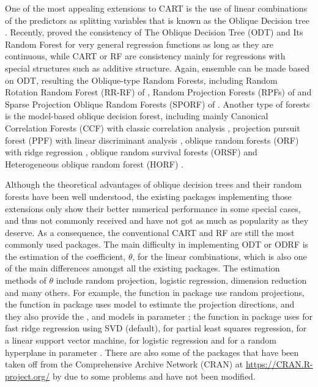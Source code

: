 \documentclass[nojss]{jss}
\newcommand{\fct}[1]{\code{#1()}}
\numberwithin{equation}{section}
\begin{document}
One of the most appealing extensions to CART is the use of linear combinations of the predictors as splitting variables that is known as the Oblique Decision tree \cite{Heath93inductionof}. Recently, \cite{zhan2022consistency} proved the consistency of The Oblique Decision Tree (\textsf{ODT}) and Its Random Forest for very general regression functions as long as they are continuous, while CART or RF are consistency mainly for regressions with special structures such as additive structure.  Again, ensemble can be made based on ODT, resulting the Oblique-type Random Forests, including Random Rotation Random Forest (\textsf{RR-RF}) of \cite{blaser2016random}, Random Projection Forests (\textsf{RPFs}) of \cite{lee2015fast} and Sparse Projection Oblique Random Forests (\textsf{SPORF}) of \cite{tomita2020sparse}. Another type of forests is the model-based oblique decision forest,  including mainly Canonical Correlation Forests (\textsf{CCF}) with classic correlation analysis \cite{rainforth2015canonical},  projection pursuit forest (\textsf{PPF}) with linear discriminant analysis \cite{silva2021projection}, oblique random forests (\textsf{ORF}) with ridge regression \cite{menze2011oblique}, oblique random survival forests (\textsf{ORSF}) \cite{jaeger2022accelerated} and Heterogeneous oblique random forest (\textsf{HORF}) \cite{katuwal2020heterogeneous}.


Although the theoretical advantages of oblique decision trees and their random forests have been well understood, the existing packages implementing those extensions only show their better numerical performance in some special cases, and thus not commonly received and have not got as much as popularity as they deserve. As a consequence, the conventional CART and RF are still the most commonly used packages.    The main difficulty in implementing \textsf{ODT} or \textsf{ODRF} is the estimation of the coefficient, $ \theta $, for the linear combinations, which is also one of the main differences amongst all the existing packages. The estimation methods  of $ \theta $ include random projection, logistic regression, dimension reduction and many others. For example, the function \fct{RerF} in  package \cite{tomita2020sparse} use random projections, the function \fct{baggtree} in  package \cite{silva2021projection} uses   model to estimate the projection directions, and they also provide the  ,  and   models in parameter ; the function \fct{obliqueRF} in  package \cite{menze2011oblique} uses  for fast ridge regression using SVD (default),  for partial least squares regression,  for a linear support vector machine,  for logistic regression and  for a random hyperplane in parameter . %
There are also some of the  packages that have been taken off from the Comprehensive  Archive Network (CRAN) at \url{https://CRAN.R-project.org/} by \citep{R} due to some problems and have not been modified.
\end{document}
